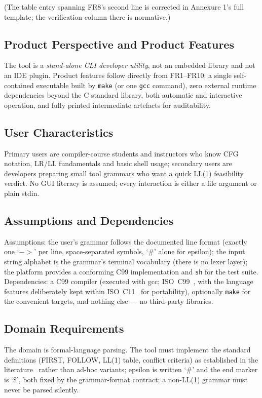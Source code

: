 \documentclass[12pt,a4paper,oneside,openany]{report}
\newcommand{\code}[1]{\texttt{#1}}
\begin{document}
\noindent (The table entry spanning FR8's second line is corrected
in Annexure 1's full template; the verification column there is
normative.)

\subsection{Product Perspective and Product Features}
The tool is a \emph{stand-alone CLI developer utility}, not an embedded
library and not an IDE plugin. Product features follow directly from
FR1--FR10: a single self-contained executable built by
\code{make} (or one \code{gcc} command), zero external runtime
dependencies beyond the C standard library, both automatic and interactive
operation, and fully printed intermediate artefacts for auditability.

\subsection{User Characteristics}
Primary users are compiler-course students and instructors who know CFG
notation, LR/LL fundamentals and basic shell usage; secondary users are
developers preparing small tool grammars who want a quick LL(1)
feasibility verdict. No GUI literacy is assumed; every interaction is
either a file argument or plain stdin.

\subsection{Assumptions and Dependencies}
Assumptions: the user's grammar follows the documented line format
(exactly one `$->$' per line, space-separated symbols, `$\#$' alone for
epsilon); the input string alphabet is the grammar's terminal vocabulary
(there is no lexer layer); the platform provides a conforming C99
implementation and \code{sh} for the test suite. Dependencies: a C99
compiler (executed with gcc; ISO~C99~\cite{isoC99}, with the language
features deliberately kept within ISO~C11~\cite{isoC11} for portability),
optionally \code{make} for the convenient targets, and nothing else ---
no third-party libraries.

\subsection{Domain Requirements}
The domain is formal-language parsing. The tool must implement the
standard definitions (FIRST, FOLLOW, LL(1) table, conflict criteria) as
established in the literature~\cite{aho2006compilers, lewis1968,
rosenkrantz1970} rather than ad-hoc variants; epsilon is written `$\#$'
and the end marker is `$\$$', both fixed by the grammar-format contract;
a non-LL(1) grammar must never be parsed silently.
\end{document}
